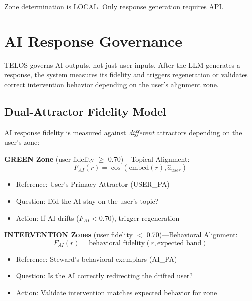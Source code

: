 \documentclass[11pt,twocolumn]{article}
\begin{document}
Zone determination is LOCAL. Only response generation requires API.

\section{AI Response Governance}

TELOS governs AI outputs, not just user inputs. After the LLM generates a response, the system measures its fidelity and triggers regeneration or validates correct intervention behavior depending on the user's alignment zone.

\subsection{Dual-Attractor Fidelity Model}

AI response fidelity is measured against \textit{different} attractors depending on the user's zone:

\textbf{GREEN Zone} (user fidelity $\geq$ 0.70)---Topical Alignment:
\begin{equation}
    F_{AI}(r) = \cos(\text{embed}(r), \hat{a}_{user})
\end{equation}
\begin{itemize}
    \item Reference: User's Primacy Attractor (USER\_PA)
    \item Question: Did the AI stay on the user's topic?
    \item Action: If AI drifts ($F_{AI} < 0.70$), trigger regeneration
\end{itemize}

\textbf{INTERVENTION Zones} (user fidelity $<$ 0.70)---Behavioral Alignment:
\begin{equation}
    F_{AI}(r) = \text{behavioral\_fidelity}(r, \text{expected\_band})
\end{equation}
\begin{itemize}
    \item Reference: Steward's behavioral exemplars (AI\_PA)
    \item Question: Is the AI correctly redirecting the drifted user?
    \item Action: Validate intervention matches expected behavior for zone
\end{itemize}
\end{document}

